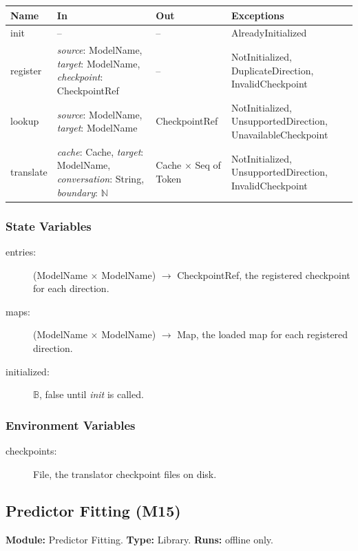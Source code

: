 \documentclass[12pt, titlepage]{article}
\begin{document}
\begin{tabularx}{\textwidth}{l X l X}
\toprule
\textbf{Name} & \textbf{In} & \textbf{Out} & \textbf{Exceptions}\\
\midrule
init & -- & -- & AlreadyInitialized\\
register & \emph{source}: ModelName, \emph{target}: ModelName, \emph{checkpoint}: CheckpointRef & -- & NotInitialized, DuplicateDirection, InvalidCheckpoint\\
lookup & \emph{source}: ModelName, \emph{target}: ModelName & CheckpointRef & NotInitialized, UnsupportedDirection, UnavailableCheckpoint\\
translate & \emph{cache}: Cache, \emph{target}: ModelName, \emph{conversation}: String, \emph{boundary}: $\mathbb{N}$ & Cache $\times$ Seq of Token & NotInitialized, UnsupportedDirection, InvalidCheckpoint\\
\bottomrule
\end{tabularx}

\subsubsection*{State Variables}

\begin{description}
\item[entries:] (ModelName $\times$ ModelName) $\to$ CheckpointRef, the registered checkpoint for each direction.
\item[maps:] (ModelName $\times$ ModelName) $\to$ Map, the loaded map for each registered direction.
\item[initialized:] $\mathbb{B}$, false until \emph{init} is called.
\end{description}

\subsubsection*{Environment Variables}

\begin{description}
\item[checkpoints:] File, the translator checkpoint files on disk.
\end{description}

\newpage
\subsection{Predictor Fitting (M15)}\label{mFit}

\textbf{Module:} Predictor Fitting. \textbf{Type:} Library. \textbf{Runs:} offline only.
\end{document}
